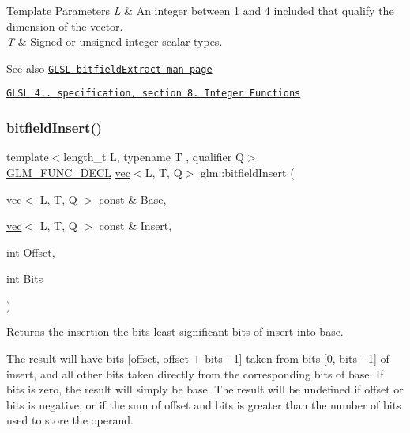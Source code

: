 \begin{DoxyTemplParams}{Template Parameters}
{\em L} & An integer between 1 and 4 included that qualify the dimension of the vector. \\
\hline
{\em T} & Signed or unsigned integer scalar types.\\
\hline
\end{DoxyTemplParams}
\begin{DoxySeeAlso}{See also}
\href{http://www.opengl.org/sdk/docs/manglsl/xhtml/bitfieldExtract.xml}{\tt G\+L\+SL bitfield\+Extract man page} 

\href{http://www.opengl.org/registry/doc/GLSLangSpec.4.20.8.pdf}{\tt G\+L\+SL 4.. specification, section 8. Integer Functions} 
\end{DoxySeeAlso}
\mbox{\label{group__core__func__integer_ga2e82992340d421fadb61a473df699b20}} 
\subsubsection{\texorpdfstring{bitfield\+Insert()}{bitfieldInsert()}}
{\footnotesize\ttfamily template$<$length\+\_\+t L, typename T , qualifier Q$>$ \\
\mbox{\hyperlink{setup_8hpp_ab2d052de21a70539923e9bcbf6e83a51}{G\+L\+M\+\_\+\+F\+U\+N\+C\+\_\+\+D\+E\+CL}} \mbox{\hyperlink{structglm_1_1vec}{vec}}$<$L, T, Q$>$ glm\+::bitfield\+Insert (\begin{DoxyParamCaption}\item[{\mbox{\hyperlink{structglm_1_1vec}{vec}}$<$ L, T, Q $>$ const \&}]{Base,  }\item[{\mbox{\hyperlink{structglm_1_1vec}{vec}}$<$ L, T, Q $>$ const \&}]{Insert,  }\item[{int}]{Offset,  }\item[{int}]{Bits }\end{DoxyParamCaption})}

Returns the insertion the bits least-\/significant bits of insert into base.

The result will have bits \mbox{[}offset, offset + bits -\/ 1\mbox{]} taken from bits \mbox{[}0, bits -\/ 1\mbox{]} of insert, and all other bits taken directly from the corresponding bits of base. If bits is zero, the result will simply be base. The result will be undefined if offset or bits is negative, or if the sum of offset and bits is greater than the number of bits used to store the operand.


